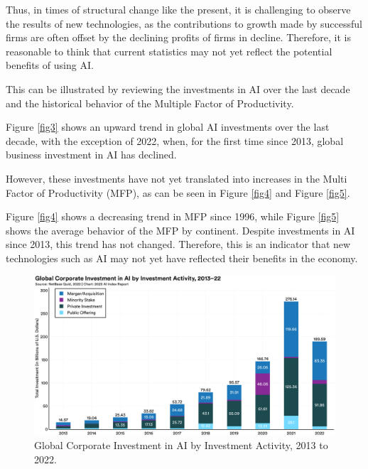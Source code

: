 \documentclass[preprint, 1p,
authoryear]{elsarticle} %
\begin{document}
Thus, in times of structural change like the present, it is challenging
to observe the results of new technologies, as the contributions to
growth made by successful firms are often offset by the declining
profits of firms in decline. Therefore, it is reasonable to think that
current statistics may not yet reflect the potential benefits of using
AI.

This can be illustrated by reviewing the investments in AI over the last
decade and the historical behavior of the Multiple Factor of
Productivity.

Figure \ref{fig3} shows an upward trend in global AI investments over
the last decade, with the exception of 2022, when, for the first time
since 2013, global business investment in AI has declined.

However, these investments have not yet translated into increases in the
Multi Factor of Productivity (MFP), as can be seen in Figure \ref{fig4}
and Figure \ref{fig5}.

Figure \ref{fig4} shows a decreasing trend in MFP since 1996, while
Figure \ref{fig5} shows the average behavior of the MFP by continent.
Despite investments in AI since 2013, this trend has not changed.
Therefore, this is an indicator that new technologies such as AI may not
yet have reflected their benefits in the economy.

\begin{figure}

{\centering \includegraphics[width=0.7\linewidth]{../Views/global_investiment_by_inv_activity} 

}

\caption{\label{fig3}Global Corporate Investment in AI by Investment Activity, 2013 to 2022.}\label{fig:fig3}
\end{figure}
\end{document}
